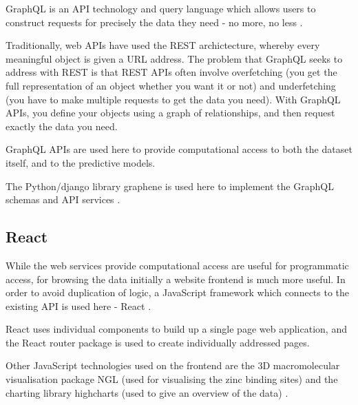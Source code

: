 GraphQL is an API technology and query language which allows users to construct requests for precisely the data they need - no more, no less \cite{graphql}.

Traditionally, web APIs have used the REST archictecture, whereby every meaningful object is given a URL address. The problem that GraphQL seeks to address with REST is that REST APIs often involve overfetching (you get the full representation of an object whether you want it or not) and underfetching (you have to make multiple requests to get the data you need). With GraphQL APIs, you define your objects using a graph of relationships, and then request exactly the data you need.

GraphQL APIs are used here to provide computational access to both the dataset itself, and to the predictive models.

The Python/django library graphene is used here to implement the GraphQL schemas and API services \cite{graphene}.

\subsection{React}

While the web services provide computational access are useful for programmatic access, for browsing the data initially a website frontend is much more useful. In order to avoid duplication of logic, a JavaScript framework which connects to the existing API is used here - React \cite{react}.

React uses individual components to build up a single page web application, and the React router package is used to create individually addressed pages.

Other JavaScript technologies used on the frontend are the 3D macromolecular visualisation package NGL (used for visualising the zinc binding sites) \cite{rose2015ngl} and the charting library highcharts (used to give an overview of the data) \cite{highcharts}.